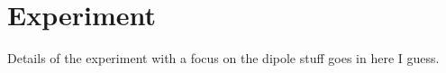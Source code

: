 \chapter{Experiment}

Details of the experiment with a focus on the dipole stuff goes in here I guess.
